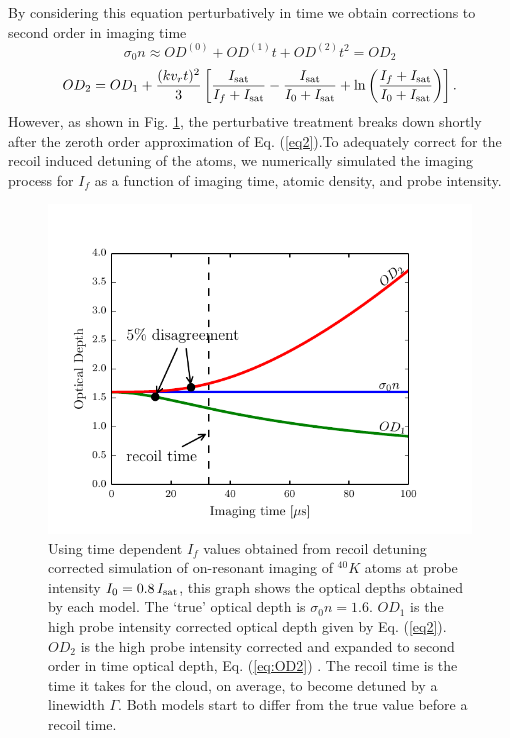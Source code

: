 \documentclass[12pt]{iopart}
\begin{document}
\par By considering this equation perturbatively in time we obtain corrections to second order in imaging time \cite{LJLthesis}
\begin{equation}
\sigma_0n\approx OD^{(0)}+OD^{(1)}t+OD^{(2)}t^2 = OD_2
\end{equation}
\begin{equation}
OD_2= OD_1+\frac{(kv_rt)^2}{3}\left[\frac{I_{\rm{sat}}}{I_f+I_{\rm{sat}}}-\frac{I_{\rm{sat}}}{I_0+I_{\rm{sat}}}+\mathrm{ln}\left(\frac{I_f+I_{\rm{sat}}}{I_0+I_{\rm{sat}}}\right)\right].
\label{eq:OD2}
\end{equation}
 However, as shown in  Fig. \ref{fig:ODcorrections}, the perturbative treatment breaks down shortly after the zeroth order approximation of Eq. (\ref{eq2}).To adequately correct for the recoil induced detuning of the atoms, we numerically simulated the imaging process for $I_f$ as a function of imaging time, atomic density, and probe intensity. 
\begin{figure}
	\includegraphics*{figure2.pdf}
\caption{Using time dependent $I_f$ values obtained from recoil detuning corrected simulation of on-resonant imaging of $^{40}K$ atoms at probe intensity $I_0=0.8\, I_{\rm{sat}}$, this graph shows the optical depths obtained by each model. The `true' optical depth is $\sigma_0 n=1.6$. $OD_1$ is the high probe intensity corrected optical depth given by Eq. (\ref{eq2}). $OD_2$ is the high probe intensity corrected and expanded to second order in time optical depth, Eq. (\ref{eq:OD2}) \cite{LJLthesis}. The recoil time is the time it takes for the cloud, on average, to become detuned by a linewidth $\Gamma$. Both models start to differ from the true value before a recoil time.  }  
\label{fig:ODcorrections}
\end{figure}
\end{document}
